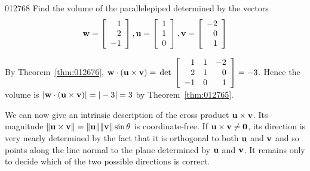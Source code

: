 \begin{example}{}{012768}
Find the volume of the parallelepiped determined by the vectors
\begin{equation*}
\textbf{w} = \left[
\begin{array}{r}
1\\
2\\
-1
\end{array}
\right],
\textbf{u} = \left[
\begin{array}{r}
1\\
1\\
0
\end{array}
\right],
\textbf{v} = \left[
\begin{array}{r}
-2\\
0\\
1
\end{array}
\right]
\end{equation*}
\begin{solution}
By Theorem~\ref{thm:012676}, 
$\textbf{w} \cdot (\textbf{u} \times \textbf{v}) = \thinspace\operatorname{det\medspace}\left[
\begin{array}{rrr}
1 & 1 & -2\\
2 & 1 & 0\\
-1 & 0 & 1
\end{array}
\right] = -3$.
Hence the volume is $|\textbf{w} \cdot (\textbf{u} \times \textbf{v})| = |-3| = 3$ by Theorem~\ref{thm:012765}.
\end{solution}
\end{example}

\begin{wrapfigure}[15]{l}{5cm}
\vspace*{-1em} 
\centering

\caption{\label{fig:012779}}
\end{wrapfigure}

We can now give an intrinsic description of the cross product $\textbf{u} \times \textbf{v}$. Its magnitude $\|\textbf{u} \times \textbf{v}\| = \|\textbf{u}\|\|\textbf{v}\| \sin \theta$ is coordinate-free. If $\textbf{u} \times \textbf{v} \neq \textbf{0}$, its direction is very nearly determined by the fact that it is orthogonal to both $\textbf{u}$ and $\textbf{v}$ and so points along the line normal to the plane determined by $\textbf{u}$ and $\textbf{v}$. It remains only to decide which of the two possible directions is correct.

